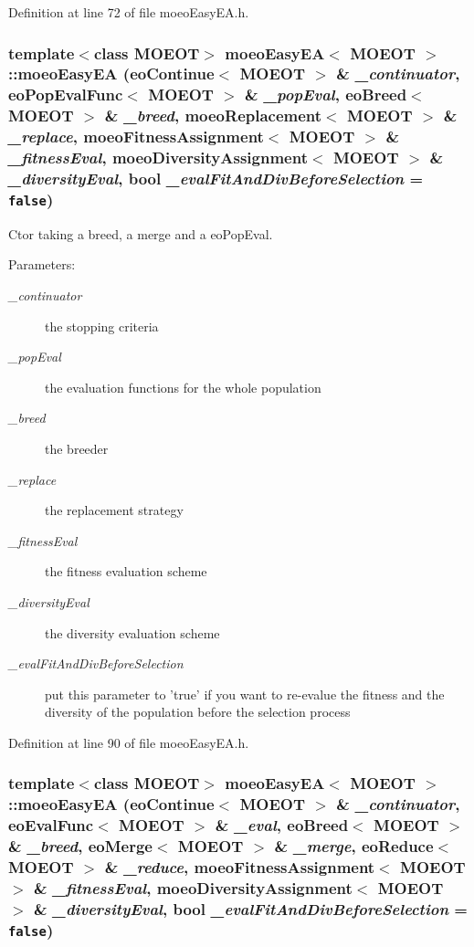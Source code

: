 Definition at line 72 of file moeo\-Easy\-EA.h.
\subsubsection{\setlength{\rightskip}{0pt plus 5cm}template$<$class MOEOT$>$ \bf{moeo\-Easy\-EA}$<$ MOEOT $>$::\bf{moeo\-Easy\-EA} (\bf{eo\-Continue}$<$ MOEOT $>$ \& {\em \_\-continuator}, \bf{eo\-Pop\-Eval\-Func}$<$ MOEOT $>$ \& {\em \_\-pop\-Eval}, \bf{eo\-Breed}$<$ MOEOT $>$ \& {\em \_\-breed}, \bf{moeo\-Replacement}$<$ MOEOT $>$ \& {\em \_\-replace}, \bf{moeo\-Fitness\-Assignment}$<$ MOEOT $>$ \& {\em \_\-fitness\-Eval}, \bf{moeo\-Diversity\-Assignment}$<$ MOEOT $>$ \& {\em \_\-diversity\-Eval}, bool {\em \_\-eval\-Fit\-And\-Div\-Before\-Selection} = {\tt false})\hspace{0.3cm}{\tt  [inline]}}\label{classmoeoEasyEA_6cdebc72ce0134ce1680dafdf94740a1}


Ctor taking a breed, a merge and a eo\-Pop\-Eval. 

\begin{Desc}
\item[Parameters:]
\begin{description}
\item[{\em \_\-continuator}]the stopping criteria \item[{\em \_\-pop\-Eval}]the evaluation functions for the whole population \item[{\em \_\-breed}]the breeder \item[{\em \_\-replace}]the replacement strategy \item[{\em \_\-fitness\-Eval}]the fitness evaluation scheme \item[{\em \_\-diversity\-Eval}]the diversity evaluation scheme \item[{\em \_\-eval\-Fit\-And\-Div\-Before\-Selection}]put this parameter to 'true' if you want to re-evalue the fitness and the diversity of the population before the selection process \end{description}
\end{Desc}


Definition at line 90 of file moeo\-Easy\-EA.h.
\subsubsection{\setlength{\rightskip}{0pt plus 5cm}template$<$class MOEOT$>$ \bf{moeo\-Easy\-EA}$<$ MOEOT $>$::\bf{moeo\-Easy\-EA} (\bf{eo\-Continue}$<$ MOEOT $>$ \& {\em \_\-continuator}, \bf{eo\-Eval\-Func}$<$ MOEOT $>$ \& {\em \_\-eval}, \bf{eo\-Breed}$<$ MOEOT $>$ \& {\em \_\-breed}, \bf{eo\-Merge}$<$ MOEOT $>$ \& {\em \_\-merge}, \bf{eo\-Reduce}$<$ MOEOT $>$ \& {\em \_\-reduce}, \bf{moeo\-Fitness\-Assignment}$<$ MOEOT $>$ \& {\em \_\-fitness\-Eval}, \bf{moeo\-Diversity\-Assignment}$<$ MOEOT $>$ \& {\em \_\-diversity\-Eval}, bool {\em \_\-eval\-Fit\-And\-Div\-Before\-Selection} = {\tt false})\hspace{0.3cm}{\tt  [inline]}}\label{classmoeoEasyEA_65c1069eeed979ca433e6caee3b5e942}


